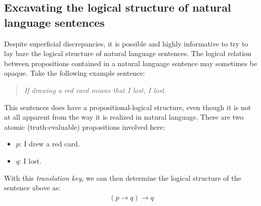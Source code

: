 \documentclass[nobib,nofonts]{tufte-handout}
\begin{document}
\subsection{Excavating the logical structure of natural language sentences}

Despite superficial discrepancies, it is possible and highly informative to try to lay bare the logical structure of natural language sentences.
The logical relation between propositions contained in a natural language sentence may sometimes be opaque.
Take the following example sentence:
\begin{quote}
  \emph{If drawing a red card means that I lost, I lost.}
\end{quote}
This sentences does have a propositional-logical structure, even though it is not at all apparent from the way it is realized in natural language.
There are two atomic (truth-evaluable) propositions involved here:
\begin{multicols}{2}
  \begin{itemize}[]
    \item $p$: I drew a red card.
    \item $q$: I lost.
  \end{itemize}
\end{multicols}
\noindent With this \emph{translation key}, we can then determine the logical structure of the sentence above as:
\begin{align*}
  (p \rightarrow q) \rightarrow q
\end{align*}
\end{document}
